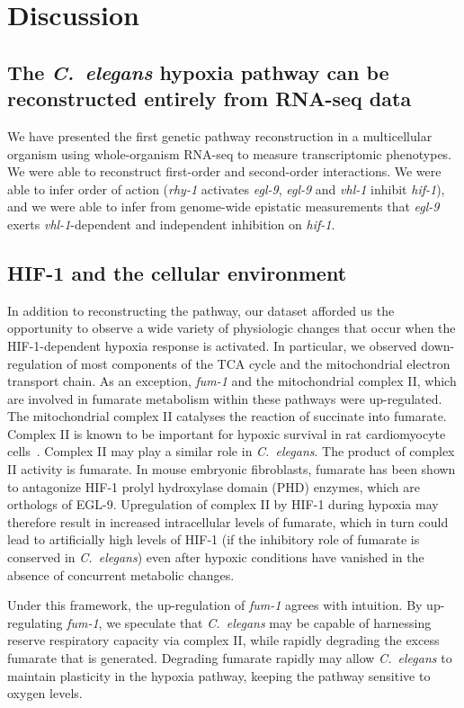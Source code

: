 \documentclass[9pt,twocolumn,twoside]{pnas-new}
\newcommand{\cel}{\emph{C.~elegans}}
\newcommand{\gene}[1]{\emph{#1}}
\newcommand{\eglp}{EGL-9}
\newcommand{\hifp}{HIF-1}
\begin{document}
\section*{Discussion}
\subsection*{The \cel{} hypoxia pathway can be reconstructed entirely from
             RNA-seq data}
We have presented the first genetic pathway reconstruction in a multicellular
organism using whole-organism RNA-seq to measure transcriptomic phenotypes.
We were able to reconstruct first-order and second-order interactions. We
were able to infer order of action (\gene{rhy-1} activates \gene{egl-9},
\gene{egl-9} and \gene{vhl-1} inhibit \gene{hif-1}), and we were able to infer
from genome-wide epistatic measurements that \gene{egl-9} exerts
\gene{vhl-1}-dependent and independent inhibition on \gene{hif-1}.

\subsection*{\hifp{} and the cellular environment}

In addition to reconstructing the pathway, our dataset afforded us the opportunity
to observe a wide variety of physiologic changes that occur when the \hifp{}-dependent
hypoxia response is activated. In particular, we observed down-regulation of most
components of the TCA cycle and the mitochondrial electron transport chain.
As an exception, \gene{fum-1} and the mitochondrial complex II, which are involved
in fumarate metabolism within these pathways were up-regulated. The mitochondrial
complex II catalyses the reaction of succinate into fumarate. Complex II is known
to be important for hypoxic survival in rat cardiomyocyte cells~\cite{Pfleger2015}.
Complex II may play a similar role in \cel{}. The product of complex II
activity is fumarate. In mouse embryonic fibroblasts, fumarate has been
shown to antagonize \hifp{} prolyl hydroxylase domain (PHD) enzymes, which are
orthologs of \eglp{}. Upregulation of complex II by \hifp{} during hypoxia may
therefore result in increased intracellular levels of fumarate, which in turn could
lead to artificially high levels of \hifp{} (if the inhibitory role of fumarate is
conserved in \cel{}) even after hypoxic conditions have vanished in the absence
of concurrent metabolic changes.

Under this framework, the up-regulation of \gene{fum-1} agrees with intuition. By
up-regulating \gene{fum-1}, we speculate that \cel{} may be capable of harnessing
reserve respiratory capacity via complex II, while rapidly degrading the excess
fumarate that is generated. Degrading fumarate rapidly may allow \cel{} to
maintain plasticity in the hypoxia pathway, keeping the pathway sensitive to
oxygen levels.
\end{document}
